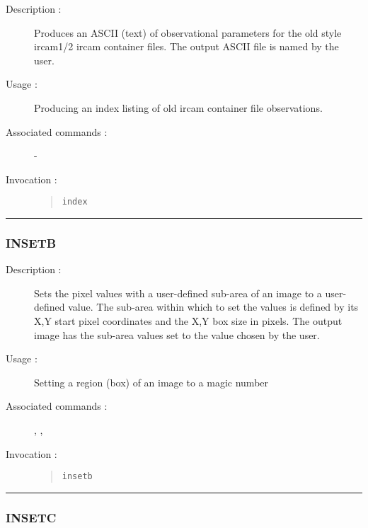 \begin{description}

\item[Description :] Produces an ASCII (text) of observational
parameters for the old style {\sc ircam1/2} {\sc ircam} container
files.  The output ASCII file is named by the user.

\item[Usage :] Producing an index listing of old {\sc ircam} container file
observations.
\item[Associated commands :] -
\item[Invocation :]

\begin{quote}{\tt  index }\end{quote}

\end{description}

\hrule
\subsubsection*{\label{INSETB}INSETB}

\begin{description}

\item[Description :] Sets the pixel values with a user-defined sub-area
of an image to a user-defined value.  The sub-area within which to set
the values is defined by its X,Y start pixel coordinates and the X,Y
box size in pixels.  The output image has the sub-area values set to
the value chosen by the user.

\item[Usage :] Setting a region (box) of an image to a magic number

\item[Associated commands :] {\tt {}},
{\tt {}}, {\tt {}}

\item[Invocation :]

\begin{quote}{\tt  insetb }\end{quote}

\end{description}

\hrule
\subsubsection*{\label{INSETC}INSETC}

